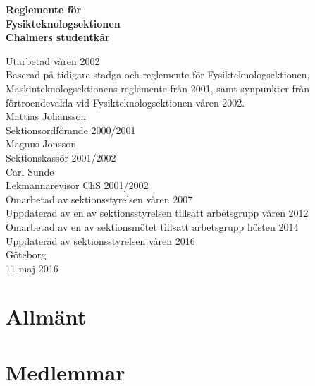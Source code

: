 \documentclass[11pt,a4paper]{article}
\begin{document}

\setlength{\headheight}{14pt}

  \begin{center}
    \textbf{\Huge{Reglemente för}}\\[3mm]
    \textbf{\Huge{Fysikteknologsektionen}}\\
    \vspace{.7 cm}
    \textbf{\Large{Chalmers studentkår}}
    
    
    \vfill
    
    Utarbetad våren 2002\\[5mm]
    Baserad på tidigare stadga och reglemente för Fysikteknologsektionen,
    Maskinteknologsektionens reglemente från 2001, samt synpunkter
    från förtroendevalda vid Fysikteknologsektionen våren 2002.\\[5mm]
    Mattias Johansson\\
    Sektionsordförande 2000/2001\\[5mm]
    Magnus Jonsson\\
    Sektionskassör 2001/2002\\[5mm]
    Carl Sunde\\
    Lekmannarevisor ChS 2001/2002\\[5mm]
    Omarbetad av sektionsstyrelsen våren 2007\\[5mm]
    Uppdaterad av en av sektionsstyrelsen tillsatt arbetsgrupp våren 2012\\[5mm]
    Omarbetad av en av sektionsmötet tillsatt arbetsgrupp hösten 2014 \\[5mm]
    Uppdaterad av sektionsstyrelsen våren 2016 \\[5mm]
    \vspace{.3 cm}
    \small{Göteborg}\\
    \small{11 maj 2016}
  \end{center}

\clearpage


\tableofcontents

\clearpage


\section{Allmänt}

\section{Medlemmar}
\end{document}
